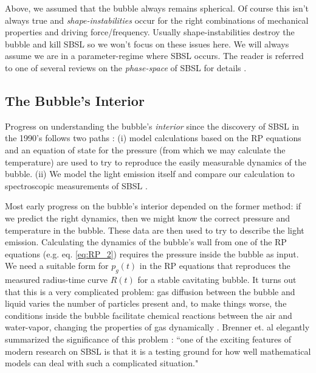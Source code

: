 \documentclass[11pt,prb,aps,nofootinbib,superscriptaddress,floatfix]{revtex4-2}
\begin{document}
Above, we assumed that the bubble always remains spherical. Of course this isn't always true and \emph{shape-instabilities} occur for the right combinations of mechanical properties and driving force/frequency. Usually shape-instabilities destroy the bubble and kill SBSL so we won't focus on these issues here. We will always assume we are in a parameter-regime where SBSL occurs. The reader is referred to one of several reviews on the \emph{phase-space} of SBSL for details \cite{yasui2018acoustic,brenner2002single,hilgenfeldt1999sonoluminescence,an2009diagnosing}. 


\subsection{The Bubble's Interior}
Progress on understanding the bubble's \emph{interior} since the discovery of SBSL in the 1990's \cite{gaitan1992sonoluminescence} follows two paths \cite{brenner2002single,suslick2008inside,yasui2018acoustic}: (i) model calculations based on the RP equations and an equation of state for the pressure (from which we may calculate the temperature) are used to try to reproduce the easily measurable dynamics of the bubble. (ii) We model the light emission itself and compare our calculation to spectroscopic measurements of SBSL \cite{hiller1992spectrum,brenner2002single}. 

Most early progress on the bubble's interior depended on the former method: if we predict the right dynamics, then we might know the correct pressure and temperature in the bubble. These data are then used to try to describe the light emission. Calculating the dynamics of the bubble's wall from one of the RP equations (e.g. eq. \ref{eq:RP_2}) requires the pressure inside the bubble as input. We need a suitable form for $p_g(t)$ in the RP equations that reproduces the measured radius-time curve $R(t)$ for a stable cavitating bubble. It turns out that this is a very complicated problem: gas diffusion between the bubble and liquid varies the number of particles present and, to make things worse, the conditions inside the bubble facilitate chemical reactions between the air and water-vapor, changing the properties of gas dynamically \cite{brenner2002single}. Brenner et. al elegantly summarized the significance of this problem \cite{brenner2002single}: ``one of the exciting features of modern research on SBSL is that it is a testing ground for how well mathematical models can deal with such a complicated situation."
\end{document}
